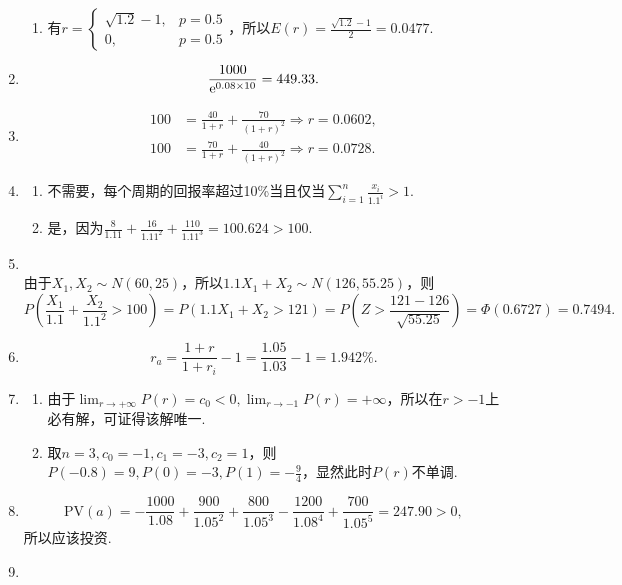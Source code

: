 \begin{enumerate}[label=\arabic{section}.\arabic*]
\begin{enumerate}[label=\alph*)]
        \item 有$r=\begin{cases}
            \sqrt{1.2}-1, & p=0.5 \\ 0, & p=0.5
        \end{cases}$，所以$\displaystyle E(r)=\frac{\sqrt{1.2}-1}{2}=0.0477$.
    \end{enumerate}
    \item \sol \[\frac{1000}{\mathrm{e}^{0.08\times 10}}=449.33.\]
    \item \sol \begin{align*}
        100 & = \frac{40}{1+r}+\frac{70}{(1+r)^2} \Rightarrow r=0.0602,\\
        100 & = \frac{70}{1+r}+\frac{40}{(1+r)^2} \Rightarrow r=0.0728.
    \end{align*}
    \item \sol {\kaishu \textcolor{blue}{注意：b)问由于翻译原因，所问不是投资回报率是否等于11\%，而是是否大于11\%.}}
    \begin{enumerate}[label=\alph*)]
        \item 不需要，每个周期的回报率超过10\%当且仅当$\displaystyle \sum_{i=1}^n \frac{x_i}{1.1^i}>1$.
        \item 是，因为$\displaystyle \frac{8}{1.11}+\frac{16}{1.11^2}+\frac{110}{1.11^3}=100.624>100$.
    \end{enumerate}
    \item \sol\\
    由于$X_1,X_2 \sim N(60,25)$，所以$\displaystyle 1.1X_1+X_2\sim N(126,55.25)$，则
    \[P\left(\frac{X_1}{1.1}+\frac{X_2}{1.1^2}>100\right)=P(1.1X_1+X_2>121)=P\left(Z>\frac{121-126}{\sqrt{55.25}}\right)=\Phi(0.6727)=0.7494.\]
    \item \sol \[r_a=\frac{1+r}{1+r_i}-1=\frac{1.05}{1.03}-1=1.942\%.\]
    \item \pro
    \begin{enumerate}[label=\alph*)]
        \item 由于$\displaystyle \lim_{r \to +\infty}P(r)=c_0<0,\lim_{r \to -1}P(r)=+\infty$，所以在$r>-1$上必有解，可证得该解唯一.
        \item 取$n=3,c_0=-1,c_1=-3,c_2=1$，则$\displaystyle P(-0.8)=9,P(0)=-3,P(1)=-\frac{9}{4}$，显然此时$P(r)$不单调.
    \end{enumerate}
    \item \sol \[\mathrm{PV}(a)=-\frac{1000}{1.08}+\frac{900}{1.05^2}+\frac{800}{1.05^3}-\frac{1200}{1.08^4}+\frac{700}{1.05^5}=247.90>0,\]所以应该投资.
    \item \pro

\end{enumerate}
